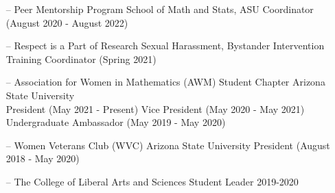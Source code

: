 \documentclass[a4paper,12pt]{article}
\begin{document}
\begin{itemize}[nosep,after=\strut, leftmargin=1em, itemsep=3pt]
    \item[--] Peer Mentorship Program 
    School of Math and Stats, ASU Coordinator (August 2020 - August 2022) 
    \item[--] Respect is a Part of Research 
    Sexual Harassment, Bystander Intervention Training 
    Coordinator (Spring 2021) 
    \item[--] Association for Women in Mathematics (AWM) Student Chapter
    Arizona State University \\
    President (May 2021 - Present)
    Vice President (May 2020 - May 2021)
    Undergraduate Ambassador (May 2019 - May 2020)
    \item[--] Women Veterans Club (WVC)
    Arizona State University
    President (August 2018 - May 2020)
    \item[--] The College of Liberal Arts and Sciences Student Leader 2019-2020
\end{itemize} 
\begin{comment}
\begin{tabularx}{\linewidth}{ @{}l r@{} }
\textbf{Some Project} & \hfill \href{https://some-link.com}{Link to Demo} \\[3.75pt]
\multicolumn{2}{@{}X@{}}{long long line of blah blah that will wrap when the table fills the column width long } \\
\end{tabularx}
\end{comment}

\vfill
{}
\end{document}
